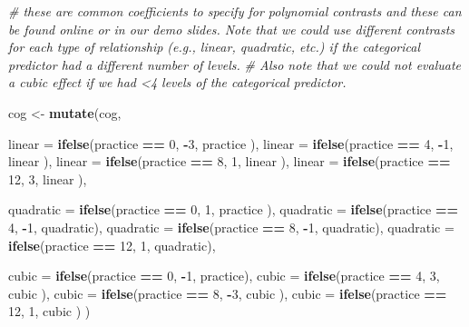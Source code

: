 \documentclass[]{article}
\newenvironment{Shaded}{\begin{snugshade}}{\end{snugshade}}
\newcommand{\KeywordTok}[1]{\textcolor[rgb]{0.13,0.29,0.53}{\textbf{#1}}}
\newcommand{\DataTypeTok}[1]{\textcolor[rgb]{0.13,0.29,0.53}{#1}}
\newcommand{\DecValTok}[1]{\textcolor[rgb]{0.00,0.00,0.81}{#1}}
\newcommand{\StringTok}[1]{\textcolor[rgb]{0.31,0.60,0.02}{#1}}
\newcommand{\CommentTok}[1]{\textcolor[rgb]{0.56,0.35,0.01}{\textit{#1}}}
\newcommand{\OperatorTok}[1]{\textcolor[rgb]{0.81,0.36,0.00}{\textbf{#1}}}
\newcommand{\NormalTok}[1]{#1}
\begin{document}
\begin{Shaded}
\begin{Highlighting}[]
\CommentTok{# these are common coefficients to specify for polynomial contrasts and these can be found online or in our demo slides. Note that we could use different contrasts for each type of relationship (e.g., linear, quadratic, etc.) if the categorical predictor had a different number of levels.}
\CommentTok{# Also note that we could not evaluate a cubic effect if we had <4 levels of the categorical predictor.}

\NormalTok{cog <-}\StringTok{ }\KeywordTok{mutate}\NormalTok{(cog,}
              
              \DataTypeTok{linear =} \KeywordTok{ifelse}\NormalTok{(practice }\OperatorTok{==}\StringTok{ }\DecValTok{0}\NormalTok{, }\OperatorTok{-}\DecValTok{3}\NormalTok{, practice ),}
              \DataTypeTok{linear =} \KeywordTok{ifelse}\NormalTok{(practice }\OperatorTok{==}\StringTok{ }\DecValTok{4}\NormalTok{, }\OperatorTok{-}\DecValTok{1}\NormalTok{, linear   ),}
              \DataTypeTok{linear =} \KeywordTok{ifelse}\NormalTok{(practice }\OperatorTok{==}\StringTok{ }\DecValTok{8}\NormalTok{,  }\DecValTok{1}\NormalTok{, linear   ),}
              \DataTypeTok{linear =} \KeywordTok{ifelse}\NormalTok{(practice }\OperatorTok{==}\StringTok{ }\DecValTok{12}\NormalTok{, }\DecValTok{3}\NormalTok{, linear   ),}
              
              \DataTypeTok{quadratic =} \KeywordTok{ifelse}\NormalTok{(practice }\OperatorTok{==}\StringTok{ }\DecValTok{0}\NormalTok{,  }\DecValTok{1}\NormalTok{, practice ),}
              \DataTypeTok{quadratic =} \KeywordTok{ifelse}\NormalTok{(practice }\OperatorTok{==}\StringTok{ }\DecValTok{4}\NormalTok{, }\OperatorTok{-}\DecValTok{1}\NormalTok{, quadratic),}
              \DataTypeTok{quadratic =} \KeywordTok{ifelse}\NormalTok{(practice }\OperatorTok{==}\StringTok{ }\DecValTok{8}\NormalTok{, }\OperatorTok{-}\DecValTok{1}\NormalTok{, quadratic),}
              \DataTypeTok{quadratic =} \KeywordTok{ifelse}\NormalTok{(practice }\OperatorTok{==}\StringTok{ }\DecValTok{12}\NormalTok{, }\DecValTok{1}\NormalTok{, quadratic),}
              
              \DataTypeTok{cubic =} \KeywordTok{ifelse}\NormalTok{(practice }\OperatorTok{==}\StringTok{ }\DecValTok{0}\NormalTok{, }\OperatorTok{-}\DecValTok{1}\NormalTok{, practice),}
              \DataTypeTok{cubic =} \KeywordTok{ifelse}\NormalTok{(practice }\OperatorTok{==}\StringTok{ }\DecValTok{4}\NormalTok{,  }\DecValTok{3}\NormalTok{, cubic   ),}
              \DataTypeTok{cubic =} \KeywordTok{ifelse}\NormalTok{(practice }\OperatorTok{==}\StringTok{ }\DecValTok{8}\NormalTok{, }\OperatorTok{-}\DecValTok{3}\NormalTok{, cubic   ),}
              \DataTypeTok{cubic =} \KeywordTok{ifelse}\NormalTok{(practice }\OperatorTok{==}\StringTok{ }\DecValTok{12}\NormalTok{, }\DecValTok{1}\NormalTok{, cubic   )}
\NormalTok{              )}
\end{Highlighting}
\end{Shaded}
\end{document}
